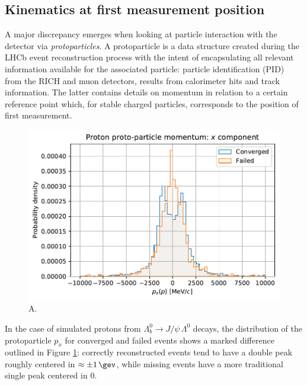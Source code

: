 \subsection{Kinematics at first measurement position}
\label{sec:3:kinematics_at_first_meas}
A major discrepancy emerges when looking at particle interaction with the detector via \textit{protoparticles}.
A protoparticle is a data structure created during the LHCb event reconstruction process with the intent of encapsulating all relevant information available for the associated particle:
particle identification (PID) from the RICH and muon detectors, results from calorimeter hits and track information.
The latter contains details on momentum in relation to a certain reference point which, for stable charged particles, corresponds to the position of first measurement.

\begin{figure}[t]
	\centering
	\includegraphics[width=.6\textwidth]{graphics/03-vertex_reconstruction/pp_p_momentum_x.pdf}
	\caption{A.}
	\label{fig:pp_p_px_conv_vs_failed}
\end{figure}

In the case of simulated protons from $\Lambda_b^0 \rightarrow J/\psi\,\Lambda^0$ decays, the distribution of the
protoparticle $p_x$ for converged and failed events shows a marked difference outlined in Figure \ref{fig:pp_p_px_conv_vs_failed}:
correctly reconstructed events tend to have a double peak roughly centered in $\approx \pm \SI{1}{\gev}$, while missing events have a more traditional single peak centered in $0$.

